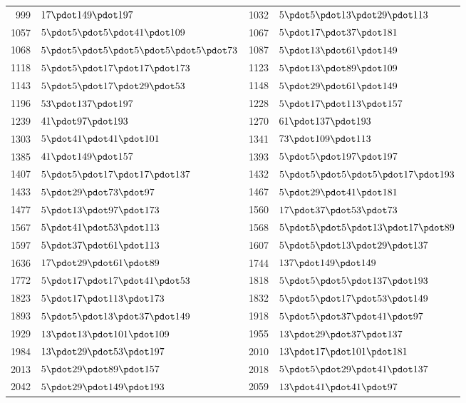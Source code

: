 \begin{longtable}{@{}r|l@{\qquad}r|l@{}}
999 & $17\pdot 149\pdot 197$ & 1032 & $5\pdot 5\pdot 13\pdot 29\pdot 113$\\
1057 & $5\pdot 5\pdot 5\pdot 41\pdot 109$ & 1067 & $5\pdot 17\pdot 37\pdot 181$\\
1068 & $5\pdot 5\pdot 5\pdot 5\pdot 5\pdot 5\pdot 73$ & 1087 & $5\pdot 13\pdot 61\pdot 149$\\
1118 & $5\pdot 5\pdot 17\pdot 17\pdot 173$ & 1123 & $5\pdot 13\pdot 89\pdot 109$\\
1143 & $5\pdot 5\pdot 17\pdot 29\pdot 53$ & 1148 & $5\pdot 29\pdot 61\pdot 149$\\
1196 & $53\pdot 137\pdot 197$ & 1228 & $5\pdot 17\pdot 113\pdot 157$\\
1239 & $41\pdot 97\pdot 193$ & 1270 & $61\pdot 137\pdot 193$\\
1303 & $5\pdot 41\pdot 41\pdot 101$ & 1341 & $73\pdot 109\pdot 113$\\
1385 & $41\pdot 149\pdot 157$ & 1393 & $5\pdot 5\pdot 197\pdot 197$\\
1407 & $5\pdot 5\pdot 17\pdot 17\pdot 137$ & 1432 & $5\pdot 5\pdot 5\pdot 5\pdot 17\pdot 193$\\
1433 & $5\pdot 29\pdot 73\pdot 97$ & 1467 & $5\pdot 29\pdot 41\pdot 181$\\
1477 & $5\pdot 13\pdot 97\pdot 173$ & 1560 & $17\pdot 37\pdot 53\pdot 73$\\
1567 & $5\pdot 41\pdot 53\pdot 113$ & 1568 & $5\pdot 5\pdot 5\pdot 13\pdot 17\pdot 89$\\
1597 & $5\pdot 37\pdot 61\pdot 113$ & 1607 & $5\pdot 5\pdot 13\pdot 29\pdot 137$\\
1636 & $17\pdot 29\pdot 61\pdot 89$ & 1744 & $137\pdot 149\pdot 149$\\
1772 & $5\pdot 17\pdot 17\pdot 41\pdot 53$ & 1818 & $5\pdot 5\pdot 5\pdot 137\pdot 193$\\
1823 & $5\pdot 17\pdot 113\pdot 173$ & 1832 & $5\pdot 5\pdot 17\pdot 53\pdot 149$\\
1893 & $5\pdot 5\pdot 13\pdot 37\pdot 149$ & 1918 & $5\pdot 5\pdot 37\pdot 41\pdot 97$\\
1929 & $13\pdot 13\pdot 101\pdot 109$ & 1955 & $13\pdot 29\pdot 37\pdot 137$\\
1984 & $13\pdot 29\pdot 53\pdot 197$ & 2010 & $13\pdot 17\pdot 101\pdot 181$\\
2013 & $5\pdot 29\pdot 89\pdot 157$ & 2018 & $5\pdot 5\pdot 29\pdot 41\pdot 137$\\
2042 & $5\pdot 29\pdot 149\pdot 193$ & 2059 & $13\pdot 41\pdot 41\pdot 97$\\

\end{longtable}
